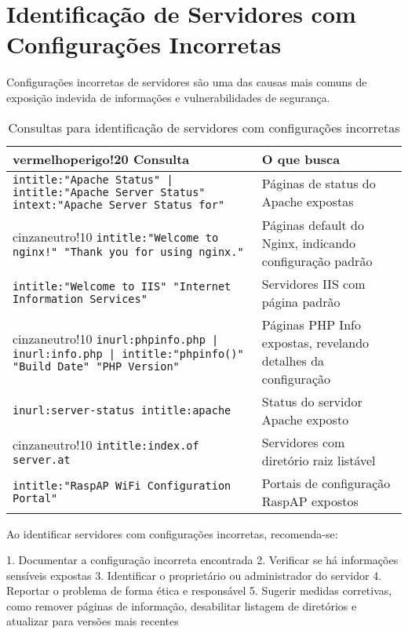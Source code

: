 \documentclass[12pt,a4paper]{book}
\begin{document}
\section{Identificação de Servidores com Configurações Incorretas}

Configurações incorretas de servidores são uma das causas mais comuns de exposição indevida de informações e vulnerabilidades de segurança.

\begin{table}[h]
\centering
\begin{tabular}{|p{8cm}|p{7cm}|}
\hline
{vermelhoperigo!20} \textbf{Consulta} & \textbf{O que busca} \\
\hline
\texttt{intitle:"Apache Status" | intitle:"Apache Server Status" intext:"Apache Server Status for"} & Páginas de status do Apache expostas \\
\hline
{cinzaneutro!10} \texttt{intitle:"Welcome to nginx!" "Thank you for using nginx."} & Páginas default do Nginx, indicando configuração padrão \\
\hline
\texttt{intitle:"Welcome to IIS" "Internet Information Services"} & Servidores IIS com página padrão \\
\hline
{cinzaneutro!10} \texttt{inurl:phpinfo.php | inurl:info.php | intitle:"phpinfo()" "Build Date" "PHP Version"} & Páginas PHP Info expostas, revelando detalhes da configuração \\
\hline
\texttt{inurl:server-status intitle:apache} & Status do servidor Apache exposto \\
\hline
{cinzaneutro!10} \texttt{intitle:index.of server.at} & Servidores com diretório raiz listável \\
\hline
\texttt{intitle:"RaspAP WiFi Configuration Portal"} & Portais de configuração RaspAP expostos \\
\hline
\end{tabular}
\caption{Consultas para identificação de servidores com configurações incorretas}
\end{table}

\begin{tipbox}
Ao identificar servidores com configurações incorretas, recomenda-se:

1. Documentar a configuração incorreta encontrada
2. Verificar se há informações sensíveis expostas
3. Identificar o proprietário ou administrador do servidor
4. Reportar o problema de forma ética e responsável
5. Sugerir medidas corretivas, como remover páginas de informação, desabilitar listagem de diretórios e atualizar para versões mais recentes
\end{tipbox}
\end{document}
